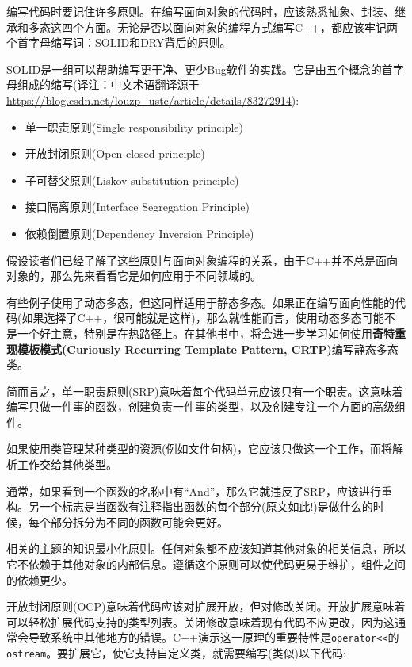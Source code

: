 
编写代码时要记住许多原则。在编写面向对象的代码时，应该熟悉抽象、封装、继承和多态这四个方面。无论是否以面向对象的编程方式编写C++，都应该牢记两个首字母缩写词：SOLID和DRY背后的原则。

SOLID是一组可以帮助编写更干净、更少Bug软件的实践。它是由五个概念的首字母组成的缩写(译注：中文术语翻译源于 \url{https://blog.csdn.net/louzp_ustc/article/details/83272914}):

\begin{itemize}
\item 单一职责原则(Single responsibility principle)
\item 开放封闭原则(Open-closed principle)
\item 子可替父原则(Liskov substitution principle)
\item 接口隔离原则(Interface Segregation Principle)
\item 依赖倒置原则(Dependency Inversion Principle)
\end{itemize}

假设读者们已经了解了这些原则与面向对象编程的关系，由于C++并不总是面向对象的，那么先来看看它是如何应用于不同领域的。

有些例子使用了动态多态，但这同样适用于静态多态。如果正在编写面向性能的代码(如果选择了C++，很可能就是这样)，那么就性能而言，使用动态多态可能不是一个好主意，特别是在热路径上。在其他书中，将会进一步学习如何使用\textbf{\href{https://ctj12461.netlify.app/2019/179eb0e9.html}{奇特重现模板模式}(Curiously Recurring Template Pattern, CRTP)}编写静态多态类。



简而言之，单一职责原则(SRP)意味着每个代码单元应该只有一个职责。这意味着编写只做一件事的函数，创建负责一件事的类型，以及创建专注一个方面的高级组件。

如果使用类管理某种类型的资源(例如文件句柄)，它应该只做这一个工作，而将解析工作交给其他类型。

通常，如果看到一个函数的名称中有“And”，那么它就违反了SRP，应该进行重构。另一个标志是当函数有注释指出函数的每个部分(原文如此!)是做什么的时候，每个部分拆分为不同的函数可能会更好。

相关的主题的知识最小化原则。任何对象都不应该知道其他对象的相关信息，所以它不依赖于其他对象的内部信息。遵循这个原则可以使代码更易于维护，组件之间的依赖更少。



开放封闭原则(OCP)意味着代码应该对扩展开放，但对修改关闭。开放扩展意味着可以轻松扩展代码支持的类型列表。关闭修改意味着现有代码不应更改，因为这通常会导致系统中其他地方的错误。C++演示这一原理的重要特性是\texttt{operator<<}的\texttt{ostream}。要扩展它，使它支持自定义类，就需要编写(类似)以下代码:


